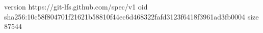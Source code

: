 version https://git-lfs.github.com/spec/v1
oid sha256:10c58f804701f21621b58810f44ec6d468322fafd3123f6418f3961ad3fb0004
size 87544
